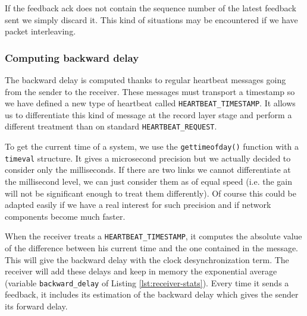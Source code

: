 If the feedback ack does not contain the sequence number of the latest feedback sent we simply discard it. This kind of situations may be encountered if we have packet interleaving. 


\subsubsection{Computing backward delay}

The backward delay is computed thanks to regular heartbeat messages going from the sender to the receiver. These messages must transport a timestamp so we have defined a new type of heartbeat called \texttt{HEARTBEAT\_TIMESTAMP}. It allows us to differentiate this kind of message at the record layer stage and perform a different treatment than on standard \texttt{HEARTBEAT\_REQUEST}. 

To get the current time of a system, we use the \texttt{gettimeofday()} function with a \texttt{timeval} structure. It gives a microsecond precision but we actually decided to consider only the milliseconds. If there are two links we cannot differentiate at the millisecond level, we can just consider them as of equal speed (i.e. the gain will not be significant enough to treat them differently). Of course this could be adapted easily if we have a real interest for such precision and if network components become much faster.

When the receiver treats a \texttt{HEARTBEAT\_TIMESTAMP}, it computes the absolute value of the difference between his current time and the one contained in the message. This will give the backward delay with the clock desynchronization term. The receiver will add these delays and keep in memory the exponential average (variable \texttt{backward\_delay} of Listing \ref{lst:receiver-stats}). Every time it sends a feedback, it includes its estimation of the backward delay which gives the sender its forward delay.




